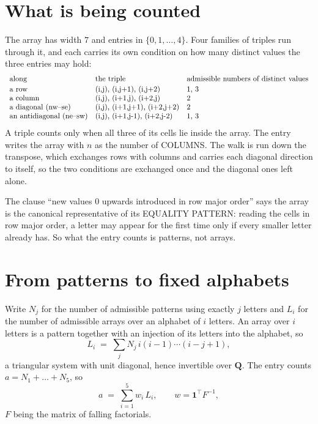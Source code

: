 \documentclass[11pt,a4paper]{article}
\theoremstyle{plain}
\theoremstyle{definition}
\begin{document}
\section{What is being counted}

The array has width $7$ and entries in $\{0,1,\dots,4\}$. Four families of triples
run through it, and each carries its own condition on how many distinct values the three
entries may hold:
\[
\begin{array}{lll}
\text{along} & \text{the triple} & \text{admissible numbers of distinct values} \\[2pt]
\text{a row} & $(i,j),\ (i,j+1),\ (i,j+2)$ & $1, 3$ \\
\text{a column} & $(i,j),\ (i+1,j),\ (i+2,j)$ & $2$ \\
\text{a diagonal (nw--se)} & $(i,j),\ (i+1,j+1),\ (i+2,j+2)$ & $2$ \\
\text{an antidiagonal (ne--sw)} & $(i,j),\ (i+1,j-1),\ (i+2,j-2)$ & $1, 3$ \\
\end{array}
\]
A triple counts only when all three of its cells lie inside the array. The entry writes the array with $n$ as the number of COLUMNS. The walk is run down the transpose, which exchanges rows with columns and carries each diagonal direction to itself, so the two conditions are exchanged once and the diagonal ones left alone.

The clause ``new values $0$ upwards introduced in row major order'' says the array is the
canonical representative of its EQUALITY PATTERN: reading the cells in row major order, a
letter may appear for the first time only if every smaller letter already has. So what the
entry counts is patterns, not arrays.

\section{From patterns to fixed alphabets}

Write $N_j$ for the number of admissible patterns using exactly $j$ letters and $L_i$ for the
number of admissible arrays over an alphabet of $i$ letters. An array over $i$ letters is a
pattern together with an injection of its letters into the alphabet, so
\[
L_i\;=\;\sum_j N_j\,i(i-1)\cdots(i-j+1),
\]
a triangular system with unit diagonal, hence invertible over $\mathbf{Q}$. The entry counts
$a=N_1+\dots+N_{5}$, so
\[
a\;=\;\sum_{i=1}^{5}w_i\,L_i ,\qquad w=\mathbf{1}^{\!\top}F^{-1},
\]
$F$ being the matrix of falling factorials.
\end{document}
